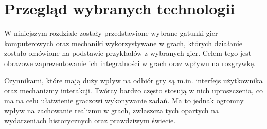 \chapter{Przegląd wybranych technologii}

W niniejszym rozdziale zostały przedstawione wybrane gatunki gier komputerowych oraz mechaniki wykorzystywane w grach,
których działanie zostało omówione na podstawie przykładów z wybranych gier. Celem tego jest obrazowe zaprezentowanie
ich integralności w grach oraz wpływu na rozgrywkę.

Czynnikami, które mają duży wpływ na odbiór gry są m.in. interfejs użytkownika oraz mechanizmy interakcji. Twórcy bardzo
często stosują w nich uproszczenia, co ma na celu
ułatwienie graczowi wykonywanie zadań. Ma to jednak ogromny wpływ na zachowanie realizmu w grach, zwłaszcza tych opartych
na wydarzeniach historycznych oraz prawdziwym świecie.













